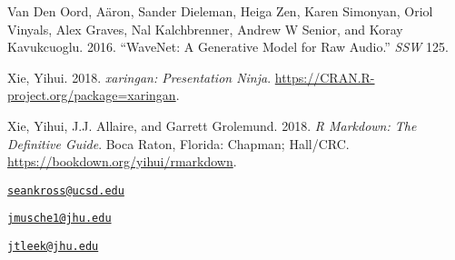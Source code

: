 \leavevmode\hypertarget{ref-van2016wavenet}{}%
Van Den Oord, Aäron, Sander Dieleman, Heiga Zen, Karen Simonyan, Oriol
Vinyals, Alex Graves, Nal Kalchbrenner, Andrew W Senior, and Koray
Kavukcuoglu. 2016. ``WaveNet: A Generative Model for Raw Audio.''
\emph{SSW} 125.

\leavevmode\hypertarget{ref-xaringan}{}%
Xie, Yihui. 2018. \emph{xaringan: Presentation Ninja}.
\url{https://CRAN.R-project.org/package=xaringan}.

\leavevmode\hypertarget{ref-rmarkdownbook}{}%
Xie, Yihui, J.J. Allaire, and Garrett Grolemund. 2018. \emph{R Markdown:
The Definitive Guide}. Boca Raton, Florida: Chapman; Hall/CRC.
\url{https://bookdown.org/yihui/rmarkdown}.



\address{%
Sean Kross\\
Cognitive Science, University of California, San Diego\\
9500 Gilman Dr.\\ La Jolla, CA 92093\\
}
\href{mailto:seankross@ucsd.edu}{\nolinkurl{seankross@ucsd.edu}}

\address{%
John Muschelli\\
Department of Biostatistics, Johns Hopkins Bloomberg School of Public
Health\\
615 N Wolfe Street\\ Baltimore, MD 21231\\
}
\href{mailto:jmusche1@jhu.edu}{\nolinkurl{jmusche1@jhu.edu}}

\address{%
Jeffrey T. Leek\\
Department of Biostatistics, Johns Hopkins Bloomberg School of Public
Health\\
615 N Wolfe Street\\ Baltimore, MD 21231\\
}
\href{mailto:jtleek@jhu.edu}{\nolinkurl{jtleek@jhu.edu}}

